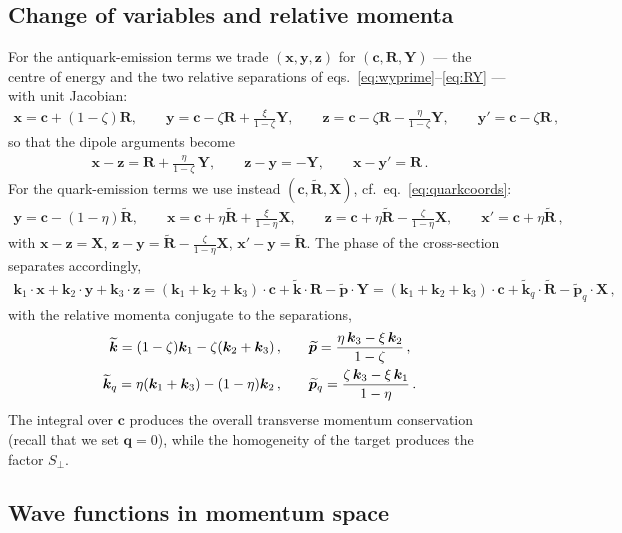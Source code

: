 \documentclass[11pt,a4paper]{article}
\newcommand{\Spe}{S_{\perp}}
\newcommand{\vx}{\bm{x}}
\newcommand{\vy}{\bm{y}}
\newcommand{\vz}{\bm{z}}
\newcommand{\vc}{\bm{c}}
\newcommand{\vR}{\bm{R}}
\newcommand{\vY}{\bm{Y}}
\newcommand{\vX}{\bm{X}}
\newcommand{\vRt}{\widetilde{\bm{R}}}
\newcommand{\vk}{\bm{k}}
\newcommand{\vq}{\bm{q}}
\newcommand{\kt}{\widetilde{\bm{k}}}
\newcommand{\pt}{\widetilde{\bm{p}}}
\newcommand{\ktq}{\widetilde{\bm{k}}_{q}}
\newcommand{\ptq}{\widetilde{\bm{p}}_{q}}
\numberwithin{equation}{section}
\begin{document}
\subsection{Change of variables and relative momenta}

For the antiquark-emission terms we trade $(\vx,\vy,\vz)$ for $(\vc,\vR,\vY)$ --- the centre
of energy and the two relative separations of eqs.~\eqref{eq:wyprime}--\eqref{eq:RY} --- with
unit Jacobian:
\begin{align}
\vx = \vc+(1-\zeta)\vR,\qquad \vy = \vc-\zeta \vR+\frac{\xi}{1-\zeta}\vY,\qquad
\vz = \vc-\zeta \vR-\frac{\eta}{1-\zeta}\vY,\qquad \vy' = \vc-\zeta \vR\,,
\end{align}
so that the dipole arguments become
\begin{align}
\vx-\vz = \vR+\frac{\eta}{1-\zeta}\,\vY,\qquad \vz-\vy=-\vY,\qquad \vx-\vy' = \vR\,.
\end{align}
For the quark-emission terms we use instead $(\vc,\vRt,\vX)$, cf.~eq.~\eqref{eq:quarkcoords}:
\begin{align}
\vy = \vc-(1-\eta)\vRt,\qquad \vx = \vc+\eta\vRt+\frac{\xi}{1-\eta}\vX,\qquad
\vz = \vc+\eta\vRt-\frac{\zeta}{1-\eta}\vX,\qquad \vx' = \vc+\eta\vRt\,,
\end{align}
with $\vx-\vz = \vX$, $\vz-\vy = \vRt-\frac{\zeta}{1-\eta}\vX$, $\vx'-\vy=\vRt$. The phase of
the cross-section separates accordingly,
\begin{align}
\label{eq:phase}
\vk_{1}\cdot \vx+\vk_{2}\cdot \vy+\vk_{3}\cdot \vz =
(\vk_{1}+\vk_{2}+\vk_{3})\cdot \vc+\kt\cdot \vR-\pt\cdot \vY
= (\vk_{1}+\vk_{2}+\vk_{3})\cdot \vc+\ktq\cdot\vRt-\ptq\cdot \vX\,,
\end{align}
with the relative momenta conjugate to the separations,
\begin{align}
\label{eq:relmom}
\kt = (1-\zeta)\vk_{1}-\zeta(\vk_{2}+\vk_{3})\,,&\qquad
\pt=\frac{\eta\,\vk_{3}-\xi\,\vk_{2}}{1-\zeta}\,,\notag\\
\ktq = \eta(\vk_{1}+\vk_{3})-(1-\eta)\vk_{2}\,,&\qquad
\ptq = \frac{\zeta\,\vk_{3}-\xi\,\vk_{1}}{1-\eta}\,.
\end{align}
The integral over $\vc$ produces the overall transverse momentum conservation (recall that we
set $\vq=0$), while the homogeneity of the target produces the factor $\Spe$.

\subsection{Wave functions in momentum space}
\end{document}
